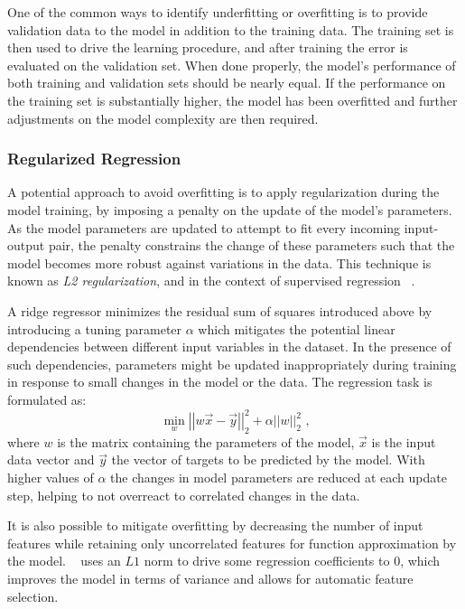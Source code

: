One of the common ways to identify underfitting or overfitting is to provide validation data to the model in addition to the training data.
The training set is then used to drive the learning procedure, and after training the error is evaluated on the validation set.
When done properly, the model's performance of both training and validation sets should be nearly equal.
If the performance on the training set is substantially higher, the model has been overfitted and further adjustments on the model complexity are then required.

\subsubsection*{Regularized Regression}

A potential approach to avoid overfitting is to apply regularization during the model training, by imposing a penalty on the update of the model's parameters.
As the model parameters are updated to attempt to fit every incoming input-output pair, the penalty constrains the change of these parameters such that the model becomes more robust against variations in the data.
This technique is known as \textit{L2 regularization}, and in the context of supervised regression ~\cite{MIT:Rifkin:Regularized_Least_Squares}.

A ridge regressor minimizes the residual sum of squares introduced above by introducing a tuning parameter \(\alpha\) which mitigates the potential linear dependencies between different input variables in the dataset.
In the presence of such dependencies, parameters might be updated inappropriately during training in response to small changes in the model or the data.
The regression task is formulated as:
\begin{equation}
    \min _w \left|\left| w \vec{x} - \vec{y} \right|\right|_2^2 + \alpha \left|\left| w \right|\right|_2^2 \text{ ,}
    \label{equation:ridge_regression_regularization}
\end{equation}
where \(w\) is the matrix containing the parameters of the model, \(\vec{x}\) is the input data vector and \(\vec{y}\) the vector of targets to be predicted by the model.
With higher values of \(\alpha\) the changes in model parameters are reduced at each update step, helping to not overreact to correlated changes in the data.

It is also possible to mitigate overfitting by decreasing the number of input features while retaining only uncorrelated features for function approximation by the model.
~\cite{JRSS:Tibshirani:Regression_Shrinkage_Selection_Via_Lasso} uses an \(L1\) norm to drive some regression coefficients to \(0\), which improves the model in terms of variance and allows for automatic feature selection.


